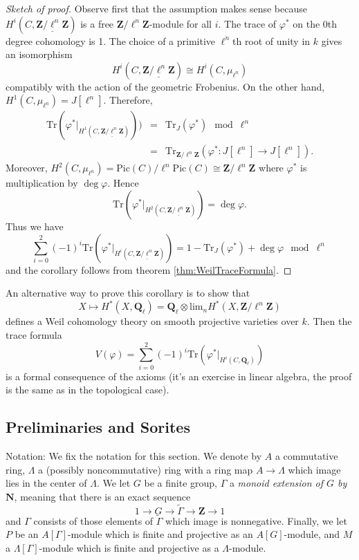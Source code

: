 \begin{proof}[Sketch of proof]
Observe first that the assumption makes sense because $H^i(C, \underline{\mathbf{Z}/\ell^n \mathbf{Z}})$ is a free $\mathbf{Z}/\ell^n \mathbf{Z}$-module for all $i$. The trace of $\varphi^*$ on the 0th degree cohomology is 1. The choice of a primitive $\ell^n$th root of unity in $k$ gives an isomorphism
$$
H^i(C,\underline{\mathbf{Z}/\ell^n \mathbf{Z}}) \cong H^i(C,\mu_{\ell^n})
$$
compatibly with the action of the geometric Frobenius. On the other hand, $H^1(C,\mu_{\ell^n}) = J[\ell^n]$. Therefore,
\begin{eqnarray*}
\text{Tr}(\varphi^* |_{H^1 (C, \underline{\mathbf{Z}/\ell^n \mathbf{Z}})})) & = & \text{Tr}_J (\varphi^*) \mod \ell^n \\
& = & \text{Tr}_{\mathbf{Z}/\ell^n \mathbf{Z}} (\varphi^* : J[\ell^n] \to J[\ell^n]).
\end{eqnarray*}
Moreover, $H^2(C,\mu_{\ell^n}) = \text{Pic}(C)/\ell^n\text{Pic}(C) \cong \mathbf{Z}/\ell^n \mathbf{Z}$ where $\varphi^*$ is multiplication by $\deg \varphi$. Hence
$$
\text{Tr} (\varphi^*|_{H^2 (C, \underline{\mathbf{Z}/\ell^n \mathbf{Z}})}) = \deg \varphi.
$$
Thus we have 
$$
\sum_{i=0}^2 (-1)^i \text{Tr}(\varphi^* |_{H^i (C, \underline{\mathbf{Z}/\ell^n \mathbf{Z}})}) = 1 - \text{Tr}_J(\varphi^*) + \deg \varphi \mod \ell^n
$$
and the corollary follows from theorem \ref{thm:WeilTraceFormula}.
\end{proof}

An alternative way to prove this corollary is to show that 
$$
X \mapsto H^* (X, \mathbf{Q}_\ell) = \mathbf{Q}_\ell \otimes \text{lim}_n H^*(X, \mathbf{Z}/\ell^n\mathbf{Z})
$$ 
defines a Weil cohomology theory on smooth projective varieties over $k$. Then the trace formula 
$$
V(\varphi) = \sum_{i=0}^2 (-1)^i \text{Tr}(\varphi^* |_{H^i (C,\mathbf{Q}_\ell)})
$$
is a formal consequence of the axioms (it's an exercise in linear algebra, the proof is the same as in the topological case).


\subsection{Preliminaries and Sorites}

Notation:
We fix the notation for this section. We denote by $A$ a commutative ring, $\Lambda$ a (possibly noncommutative) ring with a ring map $A\to \Lambda$ which image lies in the center of $\Lambda$. We let $G$ be a finite group, $\Gamma$ a \emph{monoid extension of $G$ by $\mathbf{N}$}, meaning that there is an exact sequence
$$
1\to G\to \tilde\Gamma\to \mathbf{Z}\to 1
$$
and $\Gamma$ consists of those elements of $\tilde\Gamma$ which image is nonnegative. Finally, we let $P$ be an $A[\Gamma]$-module which is finite and projective as an $A[G]$-module, and $M$ a $\Lambda[\Gamma]$-module which is finite and projective as a $\Lambda$-module.


